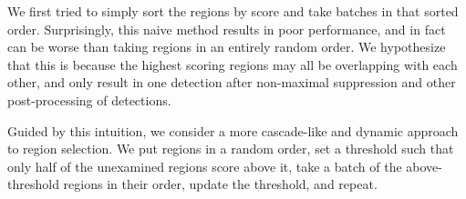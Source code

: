 We first tried to simply sort the regions by score and take batches in that sorted order.
Surprisingly, this naive method results in poor performance, and in fact can be worse than taking regions in an entirely random order.
We hypothesize that this is because the highest scoring regions may all be overlapping with each other, and only result in one detection after non-maximal suppression and other post-processing of detections.

Guided by this intuition, we consider a more cascade-like and dynamic approach to region selection.
We put regions in a random order, set a threshold such that only half of the unexamined regions score above it, take a batch of the above-threshold regions in their order, update the threshold, and repeat.
